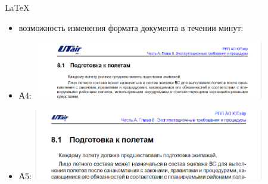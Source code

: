 \documentclass[utf8]{beamer}
\begin{document}
\begin{frame}{LaTeX}  
    \begin{itemize}
        \item <1-> возможность изменения формата документа в течении минут:
        \item <2-> А4: \includegraphics[width=0.8\textwidth]{lt06-a4.png}
        \item <3-> А5: \includegraphics[width=0.8\textwidth]{lt07-a5.png}
    \end{itemize}              
\end{frame}
\end{document}
